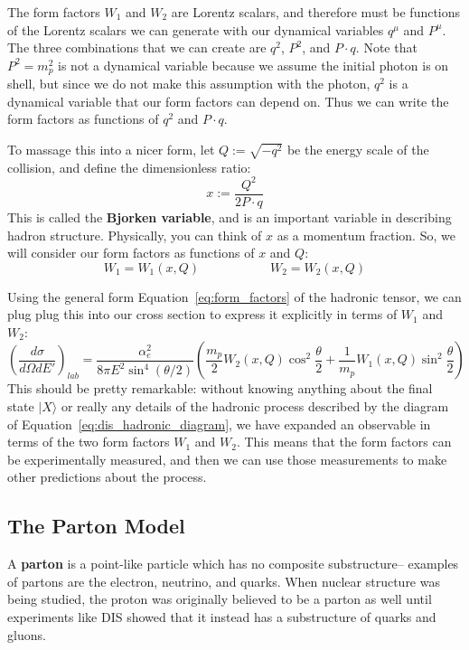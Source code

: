 \documentclass[11pt, oneside]{article}   	%
\theoremstyle{definition}
\begin{document}
The form factors $W_1$ and $W_2$ are Lorentz scalars, and therefore must be functions of the Lorentz scalars we can generate with 
our dynamical variables $q^\mu$ and $P^\mu$. The three combinations that we can create are $q^2$, $P^2$, and $P\cdot q$. Note that 
$P^2 = m_p^2$ is not a dynamical variable because we assume the initial photon is on shell, but since we do not make this assumption 
with the photon, $q^2$ is a dynamical variable that our form factors can depend on. Thus we can write the form factors as functions 
of $q^2$ and $P\cdot q$. 

To massage this into a nicer form, let $Q := \sqrt{-q^2}$ be the energy scale of the collision, and define the dimensionless ratio:
\begin{equation}
	x := \frac{Q^2}{2 P\cdot q}
\end{equation}
This is called the \textbf{Bjorken variable}, and is an important variable in describing hadron structure. Physically, you can think of $x$ as a 
momentum fraction. So, we will consider our form factors as functions of $x$ and $Q$:
\begin{equation}
	W_1 = W_1(x, Q)\;\;\;\;\;\;\;\;\;\;\;\;\;\;\;\;\;\;\;\; W_2 = W_2(x, Q)
\end{equation}

Using the general form Equation~\ref{eq:form_factors} of the hadronic tensor, we can plug plug this into our cross section to express 
it explicitly in terms of $W_1$ and $W_2$:
\begin{equation}
	\left(\frac{d\sigma}{d\Omega dE'}\right)_{lab} = \frac{\alpha_e^2}{8\pi E^2\sin^4(\theta / 2)}\left(\frac{m_p}{2} W_2(x, Q)\cos^2\frac{\theta}{2} + 
	\frac{1}{m_p} W_1(x, Q)\sin^2\frac{\theta}{2}\right)
\end{equation}
This should be pretty remarkable: without knowing anything about the final state $|X\rangle$ or really any details of the hadronic process 
described by the diagram of Equation~\ref{eq:dis_hadronic_diagram}, we have expanded an observable in terms of the two form 
factors $W_1$ and $W_2$. This means that the form factors can be experimentally measured, and then we can use those measurements 
to make other predictions about the process. 

\subsection{The Parton Model}

A \textbf{parton} is a point-like particle which has no composite substructure-- examples of partons are the electron, neutrino, and quarks. 
When nuclear structure was being studied, the proton was originally believed to be a parton as well until experiments like DIS showed 
that it instead has a substructure of quarks and gluons. 
\end{document}
